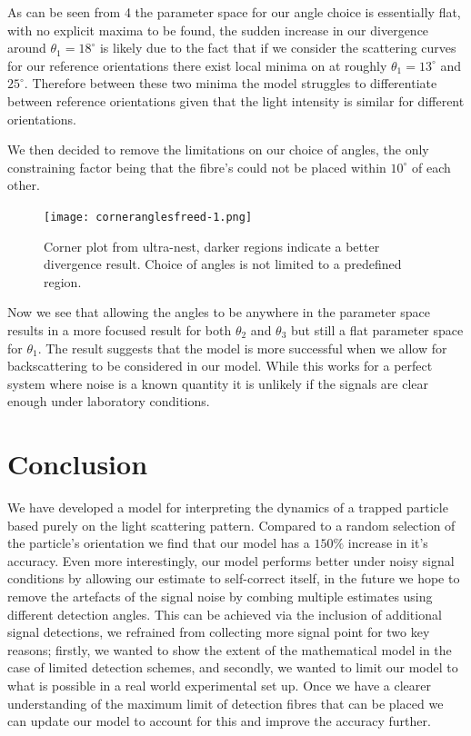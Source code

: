 \documentclass[final,3p, twocolumn]{elsarticle}
\begin{document}
As can be seen from \figurename{ 4} the parameter space for our angle choice is essentially flat, with no explicit maxima to be found, the sudden increase in our divergence around $\theta_1 = 18^{\circ}$ is likely due to the fact that if we consider the scattering curves for our reference orientations there exist local minima on at roughly $\theta_1 = 13^{\circ}$ and $25^{\circ}$. Therefore between these two minima the model struggles to differentiate between reference orientations given that the light intensity is similar for different orientations. 

We then decided to remove the limitations on our choice of angles, the only constraining factor being that the fibre's could not be placed within $10^{\circ}$ of each other. 

\begin{figure} [h]
	\centering
	\texttt{[image: corneranglesfreed-1.png]}
	\caption{Corner plot from ultra-nest, darker regions indicate a better divergence result. Choice of angles is not limited to a predefined region.}
\end{figure}

Now we see that allowing the angles to be anywhere in the parameter space results in a more focused result for both $\theta_2$ and $\theta_3$ but still a flat parameter space for $\theta_1$. The result suggests that the model is more successful when we allow for backscattering to be considered in our model. While this works for a perfect system where noise is a known quantity it is unlikely if the signals are clear enough under laboratory conditions.

	
\section{Conclusion}
\label{4}
We have developed a model for interpreting the dynamics of a trapped particle based purely on the light scattering pattern. Compared to a random selection of the particle's orientation we find that our model has a $150\%$ increase in it's accuracy. Even more interestingly, our model performs better under noisy signal conditions by allowing our estimate to self-correct itself, in the future we hope to remove the artefacts of the signal noise by combing multiple estimates using different detection angles. This can be achieved via the inclusion of additional signal detections, we refrained from collecting more signal point for two key reasons; firstly, we wanted to show the extent of the mathematical model in the case of limited detection schemes, and secondly, we wanted to limit our model to what is possible in a real world experimental set up. Once we have a clearer understanding of the maximum limit of detection fibres that can be placed we can update our model to account for this and improve the accuracy further. 
\end{document}

